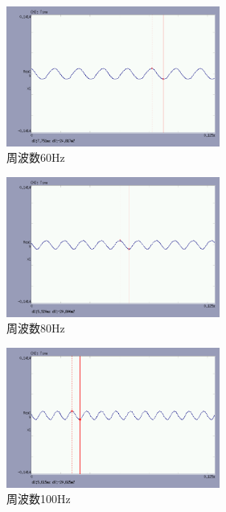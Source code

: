 \documentclass[twocolumn, 10pt,a4j]{jsarticle}
\begin{document}
    \begin{figure}[H]
      \begin{center}
        \includegraphics[width=7cm]{../img/experiments/008.png}
        \caption{周波数60Hz}
      \end{center}
    \end{figure}

    \begin{figure}[H]
      \begin{center}
        \includegraphics[width=7cm]{../img/experiments/009.png}
        \caption{周波数80Hz}
      \end{center}
    \end{figure}

    \begin{figure}[H]
      \begin{center}
        \includegraphics[width=7cm]{../img/experiments/010.png}
        \caption{周波数100Hz}
      \end{center}
    \end{figure}
  
\end{document}
